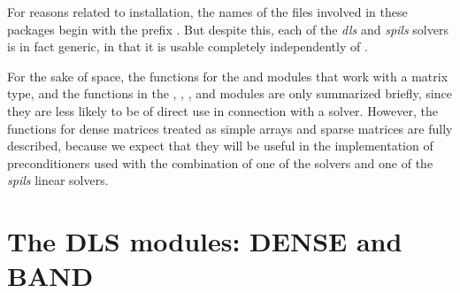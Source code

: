 For reasons related to installation, the names of the files involved
in these packages begin with the prefix .  But
despite this, each of the {\em dls} and {\em spils} solvers is in fact generic, 
in that it is usable completely independently of {\sundials}.

For the sake of space, the functions for the  and  modules
that work with a matrix type, and the functions in the {\spgmr}, 
{\spfgmr}, {\spbcg}, and {\sptfqmr}
modules are only summarized briefly, since they are less likely to be of direct use
in connection with a {\sundials} solver.  However, the functions for dense matrices 
treated as simple arrays and sparse matrices are fully described,
because we expect that they will be 
useful in the implementation of preconditioners used with the combination of one of
the {\sundials} solvers and one of the {\em spils} linear solvers.


\section{The DLS modules: DENSE and BAND}\label{s:dls}


